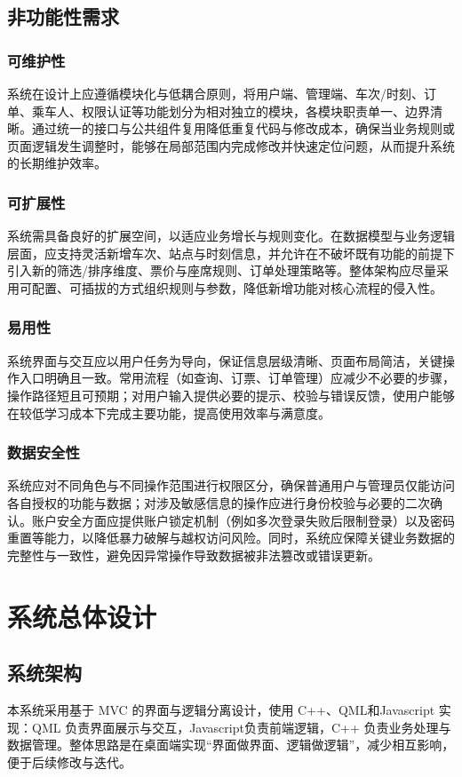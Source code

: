 \documentclass{article}
\begin{document}
		
		\subsection{非功能性需求}
			\subsubsection{可维护性}
				系统在设计上应遵循模块化与低耦合原则，将用户端、管理端、车次/时刻、订单、乘车人、权限认证等功能划分为相对独立的模块，各模块职责单一、边界清晰。通过统一的接口与公共组件复用降低重复代码与修改成本，确保当业务规则或页面逻辑发生调整时，能够在局部范围内完成修改并快速定位问题，从而提升系统的长期维护效率。
			
			\subsubsection{可扩展性}
				系统需具备良好的扩展空间，以适应业务增长与规则变化。在数据模型与业务逻辑层面，应支持灵活新增车次、站点与时刻信息，并允许在不破坏既有功能的前提下引入新的筛选/排序维度、票价与座席规则、订单处理策略等。整体架构应尽量采用可配置、可插拔的方式组织规则与参数，降低新增功能对核心流程的侵入性。
			
			\subsubsection{易用性}
				系统界面与交互应以用户任务为导向，保证信息层级清晰、页面布局简洁，关键操作入口明确且一致。常用流程（如查询、订票、订单管理）应减少不必要的步骤，操作路径短且可预期；对用户输入提供必要的提示、校验与错误反馈，使用户能够在较低学习成本下完成主要功能，提高使用效率与满意度。
			
			\subsubsection{数据安全性}
				系统应对不同角色与不同操作范围进行权限区分，确保普通用户与管理员仅能访问各自授权的功能与数据；对涉及敏感信息的操作应进行身份校验与必要的二次确认。账户安全方面应提供账户锁定机制（例如多次登录失败后限制登录）以及密码重置等能力，以降低暴力破解与越权访问风险。同时，系统应保障关键业务数据的完整性与一致性，避免因异常操作导致数据被非法篡改或错误更新。
		
	\section{系统总体设计}
		\subsection{系统架构}
			本系统采用基于 MVC 的界面与逻辑分离设计，使用 C++、QML和Javascript 实现：QML 负责界面展示与交互，Javascript负责前端逻辑，C++ 负责业务处理与数据管理。整体思路是在桌面端实现“界面做界面、逻辑做逻辑”，减少相互影响，便于后续修改与迭代。
			
\end{document}
